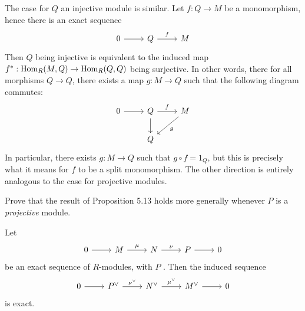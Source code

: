 \documentclass[../../master.tex]{subfiles}
\begin{document}
\begin{solution}
    The case for $Q$ an injective module is similar.
    Let $f : Q \to M$ be a monomorphism, hence there is an exact sequence
    \[
    \begin{tikzcd}
        0 & Q & M
        \arrow[from=1-1, to=1-2]
        \arrow[from=1-2, to=1-3, "f"]
    \end{tikzcd}
    \]
    Then $Q$ being injective is equivalent to the induced map $f^{*} : \operatorname{Hom}_R(M, Q) \to \operatorname{Hom}_R(Q, Q)$ being surjective.
    In other words, there for all morphisms $Q \to Q$, there exists a map $g : M \to Q$ such that the following diagram commutes:
    \[
    \begin{tikzcd}
        0 & Q & M \\
          & Q & 
        \arrow[from=1-1, to=1-2]
        \arrow[from=1-2, to=1-3, "f"]
        \arrow[from=1-2, to=2-2]
        \arrow[from=1-3, to=2-2, "g"] 
    \end{tikzcd}
    \]
    In particular, there exists $g: M \to Q$ such that $g \circ f = 1_Q$, but this is precisely what it means for $f$ to be a split monomorphism.
    The other direction is entirely analogous to the case for projective modules.
\end{solution}

\begin{problem}
    Prove that the result of Proposition 5.13 holds more generally whenever $P$ is a \textit{projective} module.
    \begin{proposition}[Proposition 5.13] 
        Let
        \[
        \begin{tikzcd}
            0 & M & N & P & 0
            \arrow[from=1-1, to=1-2]
            \arrow[from=1-2, to=1-3, "\mu"]
            \arrow[from=1-3, to=1-4, "\nu"] 
            \arrow[from=1-4, to=1-5] 
        \end{tikzcd}
        \]
        be an exact sequence of $R$-modules, with $P$ .
        Then the induced sequence
        \[
        \begin{tikzcd}
            0 & P^{\vee} & N^{\vee} & M^{\vee} & 0
            \arrow[from=1-1, to=1-2]
            \arrow[from=1-2, to=1-3, "\nu^{\vee}"]
            \arrow[from=1-3, to=1-4, "\mu^{\vee}"] 
            \arrow[from=1-4, to=1-5] 
        \end{tikzcd}
        \]
        is exact.
    \end{proposition}
\end{problem}
\end{document}
